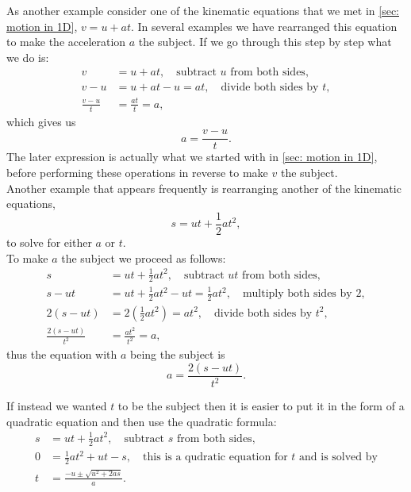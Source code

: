As another example consider one of the kinematic equations that we met in \cref{sec: motion in 1D}, $v=u+at$. In several examples we have rearranged this equation to make the acceleration $a$ the subject. If we go through this step by step what we do is:
\begin{align*}
v&=u+at, \quad \text{subtract $u$ from both sides},\\
v-u&=u+at -u=at, \quad \text{divide both sides by $t$},\\
\frac{v-u}{t}&=\frac{at}{t}=a,
\end{align*}
which gives us
\begin{equation*}
a=\frac{v-u}{t}.
\end{equation*}
The later expression is actually what we started with in \cref{sec: motion in 1D}, before performing these operations in reverse to make $v$ the subject.\\

Another example that appears frequently is rearranging another of the kinematic equations,
\begin{equation*}
s=ut+\frac{1}{2}at^{2},
\end{equation*}
to solve for either $a$ or $t$.\\

To make $a$ the subject we proceed as follows:
\begin{align*}
s&=ut+\frac{1}{2}at^{2}, \quad \text{subtract $ut$ from both sides},\\
s-ut&=ut+\frac{1}{2}at^{2}-ut=\frac{1}{2}at^{2}, \quad \text{multiply both sides by $2$},\\
2\left(s-ut\right)&=2\left(\frac{1}{2}at^{2}\right)=at^{2}, \quad \text{divide both sides by $t^{2}$},\\
\frac{2\left(s-ut\right)}{t^{2}}&=\frac{at^{2}}{t^{2}}=a,
\end{align*}
thus the equation with $a$ being the subject is 
\begin{equation*}
a=\frac{2\left(s-ut\right)}{t^{2}}.
\end{equation*}

If instead we wanted $t$ to be the subject then it is easier to put it in the form of a quadratic equation and then use the quadratic formula:
\begin{align*}
s&=ut+\frac{1}{2}at^{2}, \quad \text{subtract $s$ from both sides},\\
0&=\frac{1}{2}at^{2}+ut-s,\quad \text{this is a qudratic equation for $t$ and is solved by}\\
t&=\frac{-u\pm\sqrt{u^{2}+2as}}{a}.
\end{align*}

